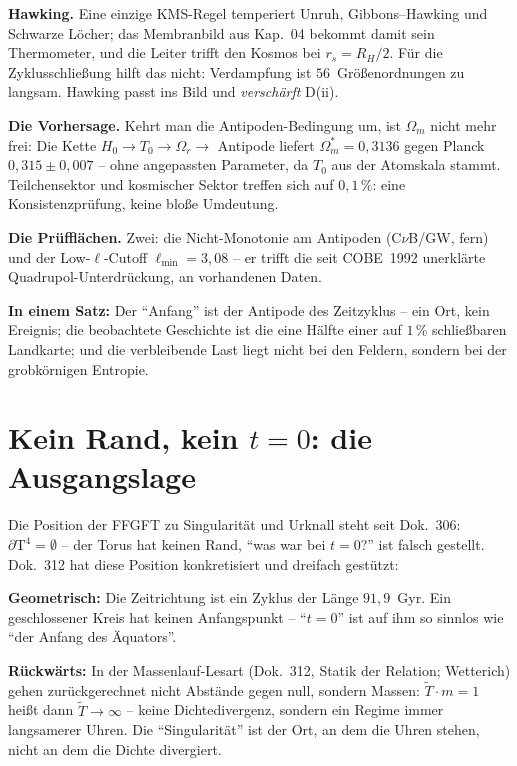 \documentclass[11pt]{report}
\begin{document}
\textbf{Hawking.} Eine einzige KMS-Regel temperiert Unruh,
Gibbons--Hawking und Schwarze Löcher; das Membranbild aus
Kap.~04 bekommt damit sein Thermometer, und die Leiter trifft den
Kosmos bei $r_s = R_H/2$. Für die Zyklusschließung hilft das
nicht: Verdampfung ist $56$~Größenordnungen zu langsam. Hawking
passt ins Bild und \emph{verschärft} D(ii).

\textbf{Die Vorhersage.} Kehrt man die Antipoden-Bedingung um,
ist $\Omega_m$ nicht mehr frei: Die Kette
$H_0 \to T_0 \to \Omega_r \to$ Antipode liefert
$\Omega_m^{*} = 0{,}3136$ gegen Planck $0{,}315\pm0{,}007$ --
ohne angepassten Parameter, da $T_0$ aus der Atomskala stammt.
Teilchensektor und kosmischer Sektor treffen sich auf
$0{,}1\,\%$: eine Konsistenzprüfung, keine bloße Umdeutung.

\textbf{Die Prüfflächen.} Zwei: die Nicht-Monotonie am Antipoden
(C$\nu$B/GW, fern) und der Low-$\ell$-Cutoff
$\ell_\text{min} = 3{,}08$ -- er trifft die seit COBE~1992
unerklärte Quadrupol-Unterdrückung, an vorhandenen Daten.

\medskip
\noindent\textbf{In einem Satz:} Der \enquote{Anfang} ist der
Antipode des Zeitzyklus -- ein Ort, kein Ereignis; die beobachtete
Geschichte ist die eine Hälfte einer auf $1\,\%$ schließbaren
Landkarte; und die verbleibende Last liegt nicht bei den Feldern,
sondern bei der grobkörnigen Entropie.

\chapter{Kein Rand, kein $t=0$: die Ausgangslage}

Die Position der FFGFT zu Singularität und Urknall steht seit
Dok.~306: $\partial\text{T}^4 = \emptyset$ -- der Torus hat keinen
Rand, \enquote{was war bei $t=0$?} ist falsch gestellt. Dok.~312
hat diese Position konkretisiert und dreifach gestützt:

\textbf{Geometrisch:} Die Zeitrichtung ist ein Zyklus der Länge
$91{,}9$~Gyr. Ein geschlossener Kreis hat keinen Anfangspunkt --
\enquote{$t=0$} ist auf ihm so sinnlos wie \enquote{der Anfang des
Äquators}.

\textbf{Rückwärts:} In der Massenlauf-Lesart (Dok.~312, Statik der
Relation; Wetterich) gehen zurückgerechnet nicht Abstände gegen
null, sondern Massen: $\tilde T \cdot m = 1$ heißt dann
$\tilde T \to \infty$ -- keine Dichtedivergenz, sondern ein Regime
immer langsamerer Uhren. Die \enquote{Singularität} ist der Ort,
an dem die Uhren stehen, nicht an dem die Dichte divergiert.
\end{document}
